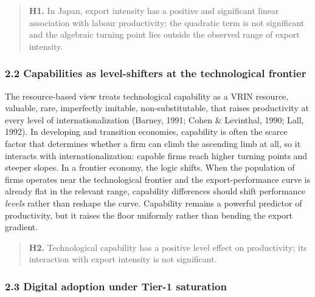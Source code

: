 \documentclass[
  12pt,a4paper]{article}
\begin{document}
\begin{quote}
\textbf{H1.} In Japan, export intensity has a positive and significant
linear association with labour productivity; the quadratic term is not
significant and the algebraic turning point lies outside the observed
range of export intensity.
\end{quote}

\hypertarget{capabilities-as-level-shifters-at-the-technological-frontier}{%
\subsubsection{2.2 Capabilities as level-shifters at the technological
frontier}\label{capabilities-as-level-shifters-at-the-technological-frontier}}

The resource-based view treats technological capability as a VRIN
resource, valuable, rare, imperfectly imitable, non-substitutable, that
raises productivity at every level of internationalization (Barney,
1991; Cohen \& Levinthal, 1990; Lall, 1992). In developing and
transition economies, capability is often the scarce factor that
determines whether a firm can climb the ascending limb at all, so it
interacts with internationalization: capable firms reach higher turning
points and steeper slopes. In a frontier economy, the logic shifts. When
the population of firms operates near the technological frontier and the
export-performance curve is already flat in the relevant range,
capability differences should shift performance \emph{levels} rather
than reshape the curve. Capability remains a powerful predictor of
productivity, but it raises the floor uniformly rather than bending the
export gradient.

\begin{quote}
\textbf{H2.} Technological capability has a positive level effect on
productivity; its interaction with export intensity is not significant.
\end{quote}

\hypertarget{digital-adoption-under-tier-1-saturation}{%
\subsubsection{2.3 Digital adoption under Tier-1
saturation}\label{digital-adoption-under-tier-1-saturation}}
\end{document}
